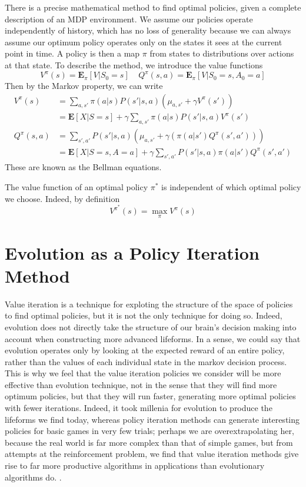 There is a precise mathematical method to find optimal policies, given a complete description of an MDP environment. We assume our policies operate independently of history, which has no loss of generality because we can always assume our optimum policy operates only on the states it sees at the current point in time. A policy is then a map $\pi$ from states to distributions over actions at that state. To describe the method, we introduce the value functions
%
\[ V^\pi(s) = \mathbf{E}_\pi[ V | S_0 = s]\ \ \ \ \ Q^\pi(s,a) = \mathbf{E}_\pi[ V | S_0 = s, A_0 = a] \]
%
Then by the Markov property, we can write
%
\begin{align*}
    V^\pi(s) &= \sum_{a,s'} \pi(a|s) P(s'|s,a) (\mu_{a,s'} + \gamma V^\pi(s'))\\
    &= \mathbf{E}[X | S = s] + \gamma \sum_{a,s'} \pi(a|s) P(s'|s,a) V^\pi(s')\\
    Q^\pi(s,a) &= \sum_{s', a'} P(s'|s,a) (\mu_{a,s'} + \gamma (\pi(a|s') Q^\pi(s',a')))\\
    &= \mathbf{E}[X | S = s, A = a] + \gamma \sum_{s',a'} P(s'|s,a) \pi(a|s') Q^\pi(s',a')
\end{align*}
%
These are known as the Bellman equations.

The value function of an optimal policy $\pi^*$ is independent of which optimal policy we choose. Indeed, by definition
%
\[ V^{\pi^*}(s) = \max_\pi V^\pi(s) \]

\section{Evolution as a Policy Iteration Method}

Value iteration is a technique for exploting the structure of the space of policies to find optimal policies, but it is not the only technique for doing so. Indeed, evolution does not directly take the structure of our brain's decision making into account when constructing more advanced lifeforms. In a sense, we could say that evolution operates only by looking at the expected reward of an entire policy, rather than the values of each individual state in the markov decision process. This is why we feel that the value iteration policies we consider will be more effective than evolution technique, not in the sense that they will find more optimum policies, but that they will run faster, generating more optimal policies with fewer iterations. Indeed, it took millenia for evolution to produce the lifeforms we find today, whereas policy iteration methods can generate interesting policies for basic games in very few trials; perhaps we are overextrapolating her, because the real world is far more complex than that of simple games, but from attempts at the reinforcement problem, we find that value iteration methods give rise to far more productive algorithms in applications than evolutionary algorithms do.
.

